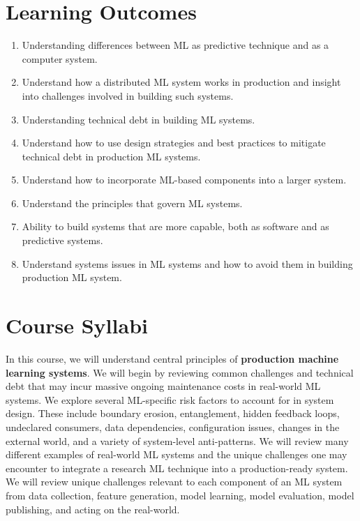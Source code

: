 \documentclass[11pt]{article}
\begin{document}
\section*{Learning Outcomes}
\begin{enumerate}
\item Understanding differences between ML as predictive technique and as a computer system.

\item Understand how a distributed ML system works in production and insight into challenges involved in building such systems.

\item Understanding technical debt in building ML systems.

\item Understand how to use design strategies and best practices to mitigate technical debt in production ML systems.

\item Understand how to incorporate ML-based components into a larger system.


\item Understand the principles that govern ML systems.

\item Ability to build systems that are more capable, both as software and as predictive systems.

\item Understand systems issues in ML systems and how to avoid them in building production ML system.

\end{enumerate}


\section*{Course Syllabi}

In this course, we will understand central principles of \textbf{production machine learning systems}. We will begin by reviewing common challenges and technical debt that may incur massive ongoing maintenance costs in real-world ML systems. We explore several ML-specific risk factors to account for in system design. These include boundary erosion, entanglement, hidden feedback loops, undeclared consumers, data dependencies, configuration issues, changes in the external world, and a variety of system-level anti-patterns. We will review many different examples of real-world ML systems and the unique challenges one may encounter to integrate a research ML technique into a production-ready system. We will review unique challenges relevant to each component of an ML system from data collection, feature generation, model learning, model evaluation, model publishing, and acting on the real-world. 
\end{document}
